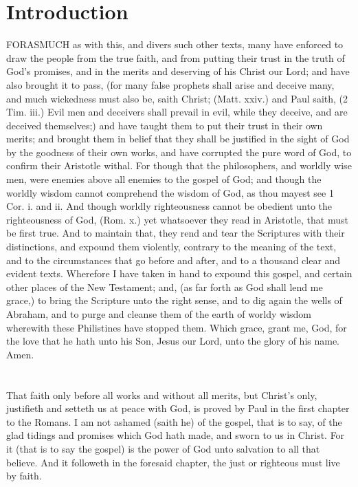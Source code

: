 \documentclass{custom}
\begin{document}
\section*{Introduction}
FORASMUCH as with this, and divers such other 
texts, many have enforced to draw the people from the 
true faith, and from putting their trust in the truth of 
God's promises, and in the merits and deserving of his 
Christ our Lord; and have also brought it to pass, (for 
many false prophets shall arise and deceive many, and 
much wickedness must also be, saith Christ; (Matt. xxiv.) 
and Paul saith, (2 Tim. iii.) Evil men and deceivers 
shall prevail in evil, while they deceive, and are deceived 
themselves;) and have taught them to put their trust in 
their own merits; and brought them in belief that they 
shall be justified in the sight of God by the goodness of 
their own works, and have corrupted the pure word of 
God, to confirm their Aristotle withal. For though that 
the philosophers, and worldly wise men, were enemies 
above all enemies to the gospel of God; and though the 
worldly wisdom cannot comprehend the wisdom of God, 
as thou mayest see 1 Cor. i. and ii. And though worldly 
righteousness cannot be obedient unto the righteousness of 
God, (Rom. x.) yet whatsoever they read in Aristotle, 
that must be first true. And to maintain that, they rend 
and tear the Scriptures with their distinctions, and
expound them violently, contrary to the meaning of the text, 
and to the circumstances that go before and after, and to 
a thousand clear and evident texts. Wherefore I have 
taken in hand to expound this gospel, and certain other 
places of the New Testament; and, (as far forth as God 
shall lend me grace,) to bring the Scripture unto the 
right sense, and to dig again the wells of Abraham, and 
to purge and cleanse them of the earth of worldy wisdom 
wherewith these Philistines have stopped them. Which 
grace, grant me, God, for the love that he hath unto 
his Son, Jesus our Lord, unto the glory of his name. 
Amen. 

\section{}
That faith only before all works and without all merits, 
but Christ's only, justifieth and setteth us at peace with 
God, is proved by Paul in the first chapter to the Romans. 
I am not ashamed (saith he) of the gospel, that is to say, 
of the glad tidings and promises which God hath made, 
and sworn to us in Christ. For it (that is to say the gospel) 
is the power of God unto salvation to all that believe. 
And it followeth in the foresaid chapter, the just or
righteous must live by faith.
\end{document}
